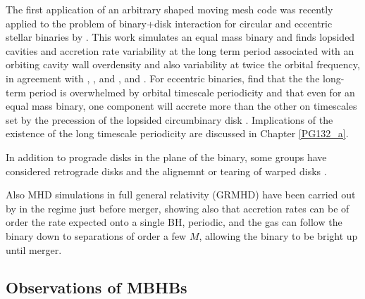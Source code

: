 The first application of an arbitrary shaped moving mesh code \citep{AREPO} was recently applied to the problem of binary+disk interaction for circular and eccentric stellar binaries by \cite{MunozLai:2016}. This work simulates an equal mass binary and finds lopsided cavities and accretion rate variability at the long term period associated with an orbiting cavity wall overdensity and also variability at twice the orbital frequency, in agreement with \cite{DHM:2013:MNRAS}, \cite{Farris:2014}, and \cite{ShiKrolik:2012}, and \cite{ShiKrolik:2015}. For eccentric binaries, \cite{MunozLai:2016} find that the the long-term period is overwhelmed by orbital timescale periodicity and that even for an equal mass binary, one component will accrete more than the other on timescales set by the precession of the lopsided circumbinary disk \citep[see also][]{Dunhill+2015}. Implications of the existence of the long timescale periodicity are discussed in Chapter \ref{PG132_a}.



In addition to prograde disks in the plane of the binary, some groups have considered retrograde disks \citep{Nixon:2011:LongSim, RoedigSGmigrate:2014, DunhillNixon:2014, BankertShiKrolik:2015, NixonLubow:RetroRes:2015, AmaroSeoane:RetroDiscs:2016} and the alignemnt or tearing of warped disks \citep{NixonKingPringle:2011, Nixon:CntrAlign:2012, Hayasaki:misalignSims:2013, NixonKing:Tear:2013, DoganNixonKingPrice:2015}.

Also MHD simulations in full general relativity (GRMHD) have been carried out
by \cite{FarrisLiuShap:2010:Bondi, FarrisShap:2011, FarrisGold:2012,
Gold:GRMHD_CBD:2014, Gold:GRMHD_CBDII:2014} in the regime just before merger,
showing also that accretion rates can be of order the rate expected onto a
single BH, periodic, and the gas can follow the binary down to separations of
order a few $M$, allowing the binary to be bright up until merger.





\subsection{Observations of MBHBs}

